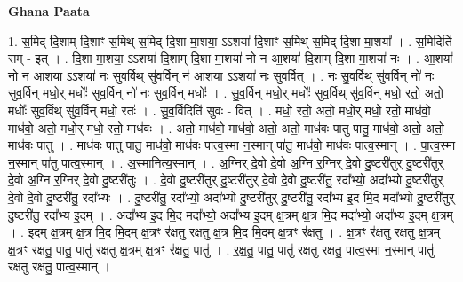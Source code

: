 \documentclass[17pt]{extarticle}
\begin{document}
\textbf{Ghana Paata } \newline

1. स॒मिद् दि॒शाम् दि॒शाꣳ स॒मिथ् स॒मिद् दि॒शा मा॒शया॒ ऽऽशया॑ दि॒शाꣳ स॒मिथ् स॒मिद् दि॒शा मा॒शया᳚ । . स॒मिदिति॑ सम् - इत् । . दि॒शा मा॒शया॒ ऽऽशया॑ दि॒शाम् दि॒शा मा॒शया॑ नो न आ॒शया॑ दि॒शाम् दि॒शा मा॒शया॑ नः । . आ॒शया॑ नो न आ॒शया॒ ऽऽशया॑ नः सुव॒र्विथ् सु॑व॒र्विन् न॑ आ॒शया॒ ऽऽशया॑ नः सुव॒र्वित् । . नः॒ सु॒व॒र्विथ् सु॑व॒र्विन् नो॑ नः सुव॒र्विन् मधो॒र् मधोः᳚ सुव॒र्विन् नो॑ नः सुव॒र्विन् मधोः᳚ । . सु॒व॒र्विन् मधो॒र् मधोः᳚ सुव॒र्विथ् सु॑व॒र्विन् मधो॒ रतो॒ अतो॒ मधोः᳚ सुव॒र्विथ् सु॑व॒र्विन् मधो॒ रतः॑ । . सु॒व॒र्विदिति॑ सुवः - वित् । . मधो॒ रतो॒ अतो॒ मधो॒र् मधो॒ रतो॒ माध॑वो॒ माध॑वो॒ अतो॒ मधो॒र् मधो॒ रतो॒ माध॑वः । . अतो॒ माध॑वो॒ माध॑वो॒ अतो॒ अतो॒ माध॑वः पातु पातु॒ माध॑वो॒ अतो॒ अतो॒ माध॑वः पातु । . माध॑वः पातु पातु॒ माध॑वो॒ माध॑वः पात्व॒स्मा न॒स्मान् पा॑तु॒ माध॑वो॒ माध॑वः पात्व॒स्मान् । . पा॒त्व॒स्मा न॒स्मान् पा॑तु पात्व॒स्मान् । . अ॒स्मानित्य॒स्मान् । . अ॒ग्निर् दे॒वो दे॒वो अ॒ग्नि र॒ग्निर् दे॒वो दु॒ष्टरी॑तुर् दु॒ष्टरी॑तुर् दे॒वो अ॒ग्नि र॒ग्निर् दे॒वो दु॒ष्टरी॑तुः । . दे॒वो दु॒ष्टरी॑तुर् दु॒ष्टरी॑तुर् दे॒वो दे॒वो दु॒ष्टरी॑तु॒ रदा᳚भ्यो॒ अदा᳚भ्यो दु॒ष्टरी॑तुर् दे॒वो दे॒वो दु॒ष्टरी॑तु॒ रदा᳚भ्यः । . दु॒ष्टरी॑तु॒ रदा᳚भ्यो॒ अदा᳚भ्यो दु॒ष्टरी॑तुर् दु॒ष्टरी॑तु॒ रदा᳚भ्य इ॒द मि॒द मदा᳚भ्यो दु॒ष्टरी॑तुर् दु॒ष्टरी॑तु॒ रदा᳚भ्य इ॒दम् । . अदा᳚भ्य इ॒द मि॒द मदा᳚भ्यो॒ अदा᳚भ्य इ॒दम् क्ष॒त्रम् क्ष॒त्र मि॒द मदा᳚भ्यो॒ अदा᳚भ्य इ॒दम् क्ष॒त्रम् । . इ॒दम् क्ष॒त्रम् क्ष॒त्र मि॒द मि॒दम् क्ष॒त्रꣳ र॑क्षतु रक्षतु क्ष॒त्र मि॒द मि॒दम् क्ष॒त्रꣳ र॑क्षतु । . क्ष॒त्रꣳ र॑क्षतु रक्षतु क्ष॒त्रम् क्ष॒त्रꣳ र॑क्षतु॒ पातु॒ पातु॑ रक्षतु क्ष॒त्रम् क्ष॒त्रꣳ र॑क्षतु॒ पातु॑ । . र॒क्ष॒तु॒ पातु॒ पातु॑ रक्षतु रक्षतु॒ पात्व॒स्मा न॒स्मान् पातु॑ रक्षतु रक्षतु॒ पात्व॒स्मान् । \newline
\end{document}
